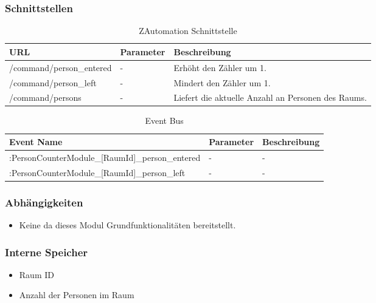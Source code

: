 \subsubsection{Schnittstellen}

\begin{table}[H]
	\begin{tabularx}{\textwidth}{
			>{\hsize=1.25\hsize}X %
			>{\hsize=0.5\hsize\centering}X %
			>{\hsize=1.25\hsize}X %
		}
		\hline
		\textbf{URL}						& \textbf{Parameter}	& \textbf{Beschreibung} \\
		\hline /command/person\_entered		& - 					& Erhöht den Zähler um 1. \\ 
		\hline /command/person\_left		& - 			 		& Mindert den Zähler um 1. \\
		\hline /command/persons				& - 					& Liefert die aktuelle Anzahl an Personen des Raums. \\
		\hline
	\end{tabularx}
	\caption{ZAutomation Schnittstelle}
\end{table}

\begin{table}[H]
	\begin{tabularx}{\textwidth}{
			>{\hsize=2.0\hsize}X %
			>{\hsize=0.5\hsize\centering}X %
			>{\hsize=0.5\hsize\centering\arraybackslash}X %
		}
		\hline
		\textbf{Event Name}						& \textbf{Parameter}	& \textbf{Beschreibung} \\
		\hline [DeviceId]:PersonCounterModule\_[RaumId]\_person\_entered	& - 					& - \\ 
		\hline [DeviceId]:PersonCounterModule\_[RaumId]\_person\_left		& - 			 		& - \\
		\hline
	\end{tabularx}
	\caption{Event Bus}
\end{table}

\subsubsection{Abhängigkeiten}
\begin{itemize}
	\item Keine da dieses Modul Grundfunktionalitäten bereitstellt.
\end{itemize}

\subsubsection{Interne Speicher}
\begin{itemize}
	\item Raum ID
	\item Anzahl der Personen im Raum
\end{itemize}


